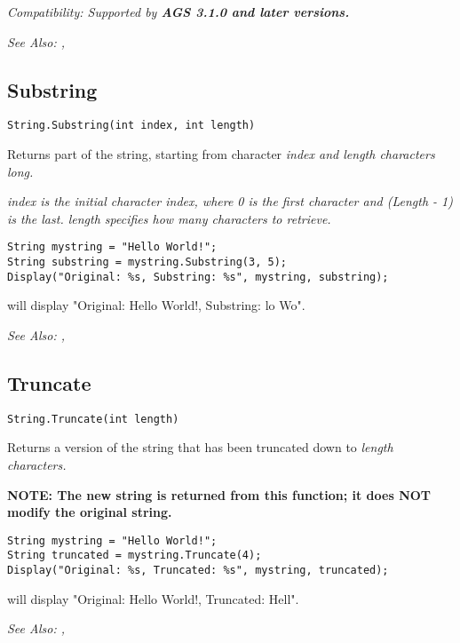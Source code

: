 \it{Compatibility:} Supported by \bf{AGS 3.1.0} and later versions.

\it{See Also:} ,


\subsection{Substring}\label{String.Substring}%

\begin{verbatim}
String.Substring(int index, int length)
\end{verbatim}
Returns part of the string, starting from character \it{index} and \it{length}
characters long.

\it{index} is the initial character index, where 0 is the first character and
(Length - 1) is the last. \it{length} specifies how many characters to retrieve.

\begin{verbatim}
String mystring = "Hello World!";
String substring = mystring.Substring(3, 5);
Display("Original: %s, Substring: %s", mystring, substring);
\end{verbatim}
will display "Original: Hello World!, Substring: lo Wo".

\it{See Also:} , 


\subsection{Truncate}\label{String.Truncate}%

\begin{verbatim}
String.Truncate(int length)
\end{verbatim}
Returns a version of the string that has been truncated down to \it{length}
characters.

\bf{NOTE:} The new string is returned from this function; it
does \bf{NOT} modify the original string.

\begin{verbatim}
String mystring = "Hello World!";
String truncated = mystring.Truncate(4);
Display("Original: %s, Truncated: %s", mystring, truncated);
\end{verbatim}
will display "Original: Hello World!, Truncated: Hell".

\it{See Also:} , 


